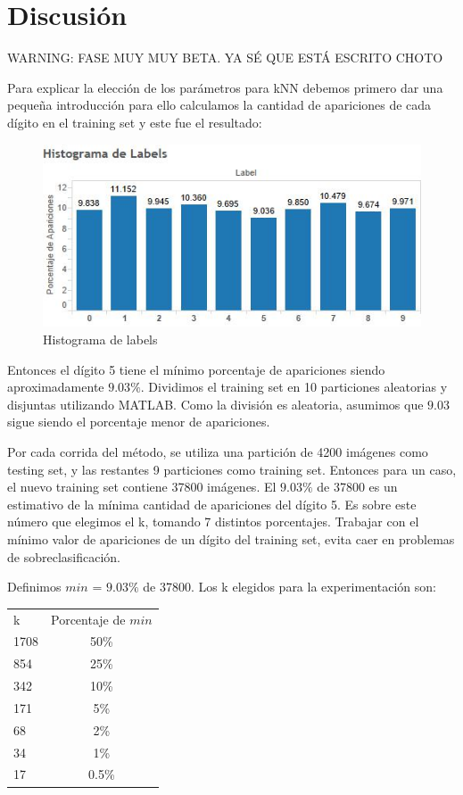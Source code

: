 \documentclass{article}
\begin{document}
\section*{Discusión}{}

WARNING: FASE MUY MUY BETA. YA SÉ QUE ESTÁ ESCRITO CHOTO

Para explicar la elección de los parámetros para kNN debemos primero dar una pequeña introducción para ello calculamos la cantidad de apariciones de cada dígito en el training set y este fue el resultado:

\begin{figure}[h]
\centering
\includegraphics[scale=0.80]{histo.jpg}
\caption{Histograma de labels}
\end{figure}

Entonces el dígito 5 tiene el mínimo porcentaje de apariciones siendo aproximadamente $9.03\%$.  Dividimos el training set en 10 particiones aleatorias y disjuntas utilizando MATLAB. Como la división es aleatoria, asumimos que $9.03$ sigue siendo el porcentaje menor de apariciones. 

Por cada corrida del método, se utiliza una partición de 4200 imágenes como testing set, y las restantes 9 particiones como training set.  Entonces para un caso, el nuevo training set contiene 37800 imágenes. El $9.03\%$ de 37800 es un estimativo de la mínima cantidad de apariciones del dígito 5. Es sobre este número que elegimos el k, tomando 7 distintos porcentajes. Trabajar con el mínimo valor de apariciones de un dígito del training set, evita caer en problemas de sobreclasificación.



Definimos $min$ = $9.03\%$ de 37800. Los k elegidos para la experimentación son: \newline
\begin{center}
\begin{tabular}{ l | c }
 k & Porcentaje de $min$  \\
1708 & 50\% \\
854 & 25\% \\
342 & 10\% \\
171 & 5\% \\
68 & 2\% \\
34 & 1\% \\
17& 0.5\% \\

\end{tabular}
\end{center}
\end{document}
